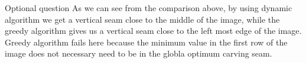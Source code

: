 \documentclass[a4paper,12pt]{article}
\begin{document}
\begin{section}{Optional question}
As we can see from the comparison above, by using dynamic algorithm we get a vertical seam close to the middle of the image, while the greedy algorithm gives us a vertical seam close to the left most edge of the image. Greedy algorithm fails here because the minimum value in the first row of the image does not necessary need to be in the globla optimum carving seam.

\end{section}
\end{document}
